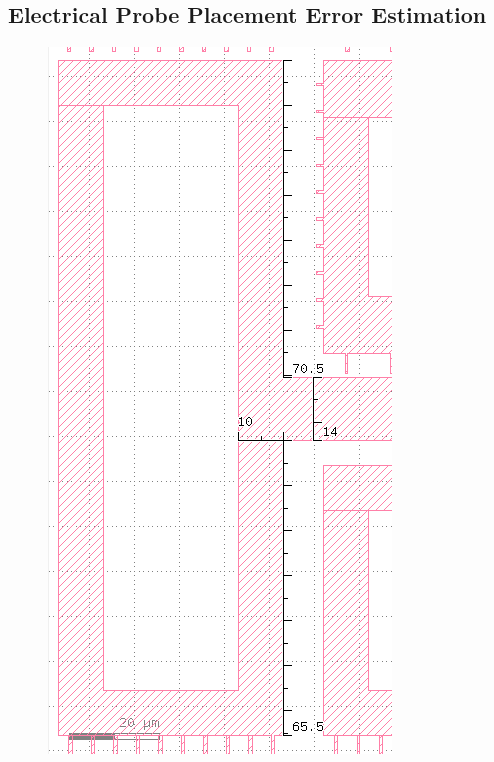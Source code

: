 \begin{refsection}
\subsection{Electrical Probe Placement Error Estimation}
\begin{figure}
  \centering
  \includegraphics[width=\linewidth]{Chapter7/Figs/Raster/big_bone_measurements_2.png}

\end{figure}
\end{refsection}

